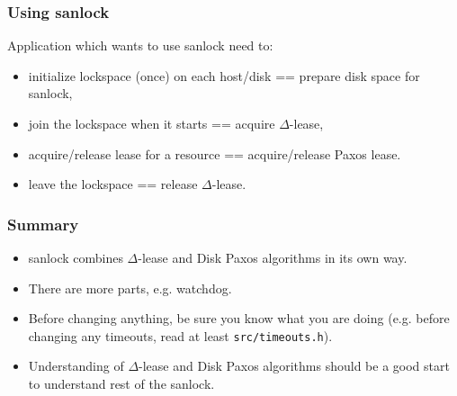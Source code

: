 \documentclass[10pt,utf8]{beamer}
\begin{document}

\begin{frame}
 \frametitle{Using sanlock}
 Application which wants to use sanlock need to:
 \begin{itemize}
  \item initialize lockspace (once) on each host/disk == prepare disk space for sanlock,
  \item join the lockspace when it starts == acquire $\Delta$-lease,
  \item acquire/release lease for a resource == acquire/release Paxos lease.
  \item leave the lockspace == release $\Delta$-lease.
 \end{itemize}
\end{frame}


\begin{frame}
  \frametitle{Summary}
  \begin{itemize}
    \item sanlock combines $\Delta$-lease and Disk Paxos algorithms in its own way.
    \item There are more parts, e.g. watchdog.
    \item Before changing anything, be sure you know what you are doing (e.g. before changing any timeouts, read at least \texttt{src/timeouts.h}).
    \item Understanding of $\Delta$-lease and Disk Paxos algorithms should be a good start to understand rest of the sanlock.
  \end{itemize}
\end{frame}
\end{document}

